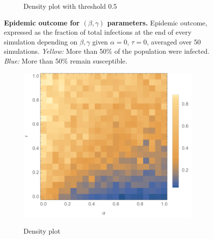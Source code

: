 \documentclass[11pt]{article}
\begin{document}
\begin{figure}[t]
\begin{subfigure}[t]{0.45\textwidth}
        \label{fig:beta_gamma_cut}
        \caption{Density plot with threshold 0.5}
	\end{subfigure}
    \caption{\textbf{Epidemic outcome for $(\beta,\gamma)$ parameters.} Epidemic outcome, expressed as the fraction of total infections at the end of every simulation depending on $\beta,\gamma$ given $\alpha=0$, $\tau=0$, averaged over 50 simulations. \textit{Yellow:} More than 50\% of the population were infected. \textit{Blue:} More than 50\% remain susceptible.}
    \label{fig:beta_gamma}
\end{figure}


\begin{figure}[t]
	\centering
	\begin{subfigure}[b]{0.535\textwidth}
    	\includegraphics[trim = 0mm 2mm 0mm 0mm, clip, width=\textwidth]{alpha_tau_omega1_beta05_gamma03_expk2_runs50_nocut_notitle.pdf}
        \label{fig:alphataunocut}
        \caption{Density plot}
	\end{subfigure}
 	\begin{subfigure}[b]{0.45\textwidth}

\end{subfigure}
\end{figure}
\end{document}
